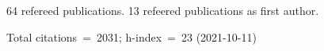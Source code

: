 64 refereed publications. 13 refeered publications as first author.

Total citations~=~2031; h-index~=~23 (2021-10-11)